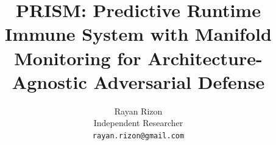 \documentclass{article}
\title{\textsc{PRISM}: Predictive Runtime Immune System with Manifold Monitoring for
       Architecture-Agnostic Adversarial Defense}
\author{%
  Rayan Rizon\\
  Independent Researcher\\
  \texttt{rayan.rizon@gmail.com}\\
}
\begin{document}
\maketitle

\begin{abstract}
  
\end{abstract}











\appendix


\newpage

\end{document}
